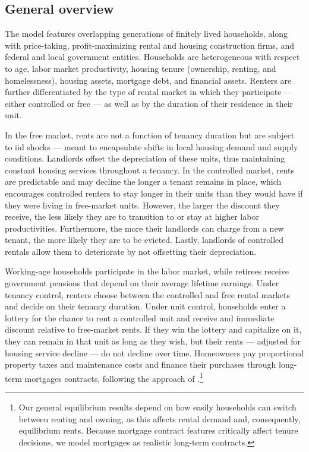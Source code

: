\documentclass[parskip=full]{article}
\begin{document}
\subsection{General overview}\label{sec:brief_overview}

The model features overlapping generations of finitely lived households, along with price-taking, profit-maximizing rental and housing construction firms, and federal and local government entities. Households are heterogeneous with respect to age, labor market productivity, housing tenure (ownership, renting, and homelessness), housing assets, mortgage debt, and financial assets. Renters are further differentiated by the type of rental market in which they participate — either controlled or free — as well as by the duration of their residence in their unit. 

In the free market, rents are not a function of tenancy duration but are subject to iid shocks — meant to encapsulate shifts in local housing demand and supply conditions. Landlords offset the depreciation of these units, thus maintaining constant housing services throughout a tenancy. In the controlled market, rents are predictable and may decline the longer a tenant remains in place, which encourages controlled renters to stay longer in their units than they would have if they were living in free-market units. However, the larger the discount they receive, the less likely they are to transition to or stay at higher labor productivities. Furthermore, the more their landlords can charge from a new tenant, the more likely they are to be evicted. Lastly, landlords of controlled rentals allow them to deteriorate by not offsetting their depreciation. 

Working-age households participate in the labor market, while retirees receive government pensions that depend on their average lifetime earnings. Under tenancy control, renters choose between the controlled and free rental markets and decide on their tenancy duration. Under unit control, households enter a lottery for the chance to rent a controlled unit and receive and immediate discount relative to free-market rents. If they win the lottery and capitalize on it, they can remain in that unit as long as they wish, but their rents — adjusted for housing service decline — do not decline over time. Homeowners pay proportional property taxes and maintenance costs and finance their purchases through long-term mortgages contracts, following the approach of \citet{kkk-2021}.\footnote{Our general equilibrium results depend on how easily households can switch between renting and owning, as this affects rental demand and, consequently, equilibrium rents. Because mortgage contract features critically affect tenure decisions, we model mortgages as realistic long-term contracts.} 
\end{document}
